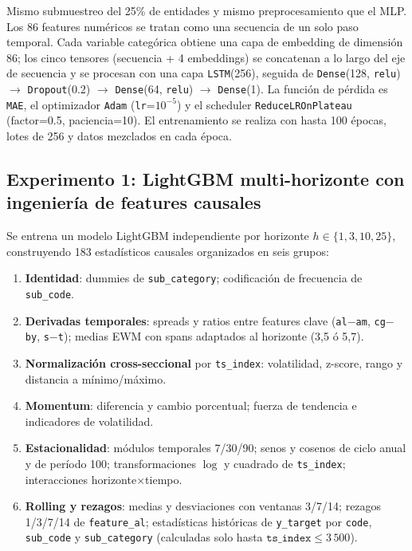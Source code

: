 \documentclass{article}
\begin{document}
Mismo submuestreo del 25\% de entidades y mismo preprocesamiento que el MLP. Los 86 features numéricos se tratan como una secuencia de un solo paso temporal. Cada variable categórica obtiene una capa de embedding de dimensión 86; los cinco tensores (secuencia + 4 embeddings) se concatenan a lo largo del eje de secuencia y se procesan con una capa \texttt{LSTM}(256), seguida de \texttt{Dense}(128, \texttt{relu}) $\to$ \texttt{Dropout}(0.2) $\to$ \texttt{Dense}(64, \texttt{relu}) $\to$ \texttt{Dense}(1). La función de pérdida es \texttt{MAE}, el optimizador \texttt{Adam} (\texttt{lr}=$10^{-5}$) y el scheduler \texttt{ReduceLROnPlateau} (factor=0.5, paciencia=10). El entrenamiento se realiza con hasta 100 épocas, lotes de 256 y datos mezclados en cada época.

\subsection{Experimento 1: LightGBM multi-horizonte con ingeniería de features causales}

Se entrena un modelo LightGBM independiente por horizonte $h \in \{1,3,10,25\}$, construyendo 183 estadísticos causales organizados en seis grupos:

\begin{enumerate}
  \item \textbf{Identidad}: dummies de \texttt{sub\_category}; codificación de frecuencia de \texttt{sub\_code}.
  \item \textbf{Derivadas temporales}: spreads y ratios entre features clave (\texttt{al$-$am}, \texttt{cg$-$by}, \texttt{s$-$t}); medias EWM con spans adaptados al horizonte (3,5 ó 5,7).
  \item \textbf{Normalización cross-seccional} por \texttt{ts\_index}: volatilidad, z-score, rango y distancia a mínimo/máximo.
  \item \textbf{Momentum}: diferencia y cambio porcentual; fuerza de tendencia e indicadores de volatilidad.
  \item \textbf{Estacionalidad}: módulos temporales 7/30/90; senos y cosenos de ciclo anual y de período 100; transformaciones $\log$ y cuadrado de \texttt{ts\_index}; interacciones horizonte$\times$tiempo.
  \item \textbf{Rolling y rezagos}: medias y desviaciones con ventanas 3/7/14; rezagos 1/3/7/14 de \texttt{feature\_al}; estadísticas históricas de \texttt{y\_target} por \texttt{code}, \texttt{sub\_code} y \texttt{sub\_category} (calculadas solo hasta $\texttt{ts\_index} \leq 3\,500$).
\end{enumerate}
\end{document}

